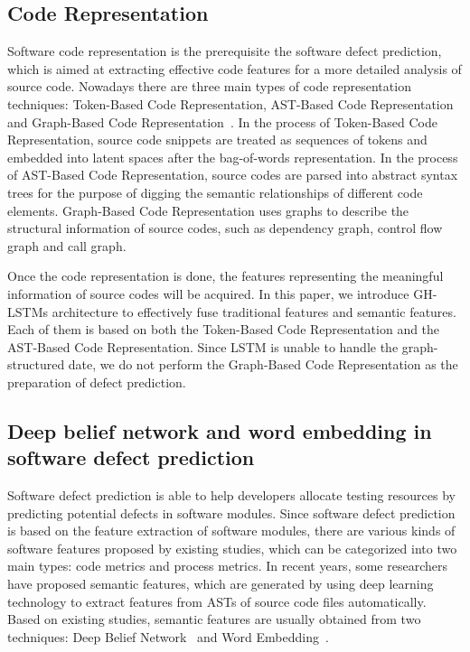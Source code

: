 \documentclass[journal]{IEEEtran}
\begin{document}
\subsection{Code Representation}
Software code representation is the prerequisite the software defect prediction, which is aimed at extracting effective code features for a more detailed analysis of source code. Nowadays there are three main types of code representation techniques: Token-Based Code Representation, AST-Based Code Representation and Graph-Based Code Representation~\cite{whua2020fcca}. In the process of Token-Based Code Representation, source code snippets are treated as sequences of tokens and embedded into latent spaces after the bag-of-words representation. In the process of AST-Based Code Representation, source codes are parsed into abstract syntax trees for the purpose of digging the semantic relationships of different code elements. Graph-Based Code Representation uses graphs to describe the structural information of source codes, such as dependency graph, control flow graph and call graph.

Once the code representation is done, the features representing the meaningful information of source codes will be acquired. In this paper, we introduce GH-LSTMs architecture to effectively fuse traditional features and semantic features. Each of them is based on both the Token-Based Code Representation and the AST-Based Code Representation. Since LSTM is unable to handle the graph-structured date, we do not perform the Graph-Based Code Representation as the preparation of defect prediction.
 
\subsection{Deep belief network and word embedding in software defect prediction}
Software defect prediction is able to help developers allocate testing resources by predicting potential defects in software modules.
Since software defect prediction is based on the feature extraction of software modules, there are various kinds of software features proposed by existing studies, which can be categorized into two main types: code metrics and process metrics. In recent years, some researchers have proposed semantic features, which are generated by using deep learning technology to extract features from ASTs of source code files automatically. Based on existing studies, semantic features are usually obtained from two techniques: Deep Belief Network~\cite{wang2018deep} and Word Embedding~\cite{fan2019deep,li2017software}.
\end{document}
